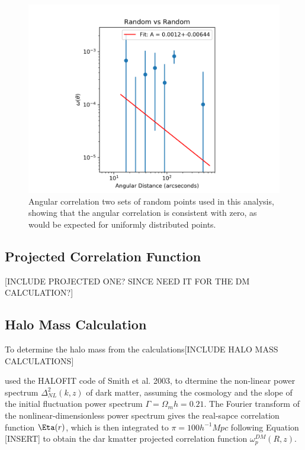 \begin{figure}[tbp]
\centering \includegraphics[width=120mm]{clustering/Log_Random_vs_Random_15000NoParenFlip_bin10.png}
\caption{Angular correlation two sets of random points used in this analysis, showing that the angular correlation is consistent with zero, as would be expected for uniformly distributed points.}
\label{fig:random_points}
\end{figure}

\subsection{Projected Correlation Function}

[INCLUDE PROJECTED ONE? SINCE NEED IT FOR THE DM CALCULATION?]

\subsection{Halo Mass Calculation}

To determine the halo mass from the calculations[INCLUDE HALO MASS CALCULATIONS]

\cite{hickox2011clustering} used the HALOFIT code of Smith et al. 2003, to dtermine the non-linear power spectrum $\Delta_{NL}^2(k,z)$ of dark matter, assuming the cosmology and the slope of the initial fluctuation power spectrum $\Gamma = \Omega_mh = 0.21$. The Fourier transform of the nonlinear-dimensionless power spectrum gives the real-sapce correlation function $\Eta(r)$, which is then integrated to $\pi = 100 h^{-1} Mpc$ following Equation [INSERT] to obtain the dar kmatter projected correlation function $\omega^{DM}_p(R,z)$.


